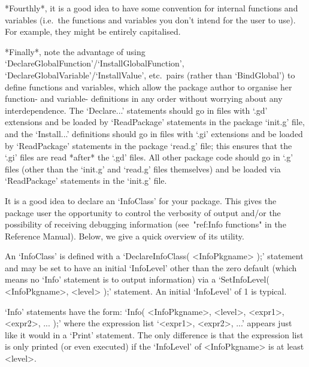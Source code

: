 *Fourthly*, it is a good  idea  to  have  some  convention  for  internal
functions and variables  (i.e.~the  functions  and  variables  you  don't
intend for the  user  to  use).  For  example,  they  might  be  entirely
capitalised.

*Finally*,        note        the        advantage        of        using
`DeclareGlobalFunction'/`InstallGlobalFunction',
`DeclareGlobalVariable'/`InstallValue',    etc.~pairs    (rather     than
`BindGlobal') to define functions and variables, which allow the  package
author to organise her function- and variable- definitions in  any  order
without worrying about any interdependence. The  `Declare...'  statements
should go in files with `.gd' extensions and be loaded  by  `ReadPackage'
statements in the package `init.g' file, and the `Install...' definitions
should go in files with `.gi' extensions and be loaded  by  `ReadPackage'
statements in the package `read.g' file;  this  ensures  that  the  `.gi'
files are read *after* the `.gd' files. All other package code should  go
in `.g' files (other than the `init.g' and `read.g' files themselves) and
be loaded via `ReadPackage' statements in the `init.g' file.


It is a good idea to declare an `InfoClass' for your package. This  gives
the package user the opportunity  to  control  the  verbosity  of  output
and/or the possibility of receiving debugging information  (see~"ref:Info
functions" in the {\GAP}  Reference  Manual).  Below,  we  give  a  quick
overview of its utility.

An `InfoClass' is defined with  a  `DeclareInfoClass(  <InfoPkgname>  );'
statement and may be set to have an initial `InfoLevel'  other  than  the
zero default (which means no `Info' statement is to  output  information)
via a `SetInfoLevel( <InfoPkgname>, <level>  );'  statement.  An  initial
`InfoLevel' of 1 is typical.

`Info' statements have the form: `Info( <InfoPkgname>, <level>,  <expr1>,
<expr2>, ... );'  where  the  expression  list  `<expr1>,  <expr2>,  ...'
appears just like it would in a `Print' statement. The only difference is
that the expression list is  only  printed  (or  even  executed)  if  the
`InfoLevel' of <InfoPkgname> is at least <level>.


